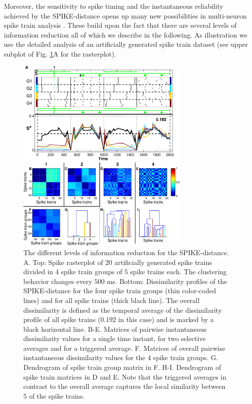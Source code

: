 \documentclass[10pt,twocolumn]{elsart5p}
\begin{document}
Moreover, the sensitivity to spike timing and the instantaneous reliability achieved by the SPIKE-distance opens up many new possibilities in multi-neuron spike train analysis \citep{Kreuz13}. These build upon the fact that there are several levels of information reduction all of which we describe in the following. As illustration we use the detailed analysis of an artificially generated spike train dataset (see upper subplot of Fig. \ref{fig:SPIKE-Representations}A for the rasterplot). 
%
%
\begin{figure}
    \includegraphics[width=85mm]{SPIKE_Representations.eps}
    \caption{\abb\label{fig:SPIKE-Representations} The different levels of information reduction for the SPIKE-distance.  A. Top: Spike rasterplot of $20$ artificially generated spike trains divided in $4$ spike train groups of $5$ spike trains each. The clustering behavior changes every $500$ ms. Bottom: Dissimilarity profiles of the SPIKE-distance for the four spike train groups (thin color-coded lines) and for all spike trains (thick black line). The overall dissimilarity is defined as the temporal average of the dissimilarity profile of all spike trains ($0.192$ in this case) and is marked by a black horizontal line.  B-E. Matrices of pairwise instantaneous dissimilarity values for a single time instant, for two selective averages and for a triggered average.  F. Matrices of overall pairwise instantaneous dissimilarity values for the $4$ spike train groups.  G. Dendrogram of spike train group matrix in F.  H-I. Dendrogram of spike train matrices in D and E. Note that the triggered averages in contrast to the overall average captures the local similarity between $5$ of the spike trains.}
\end{figure}
\end{document}
